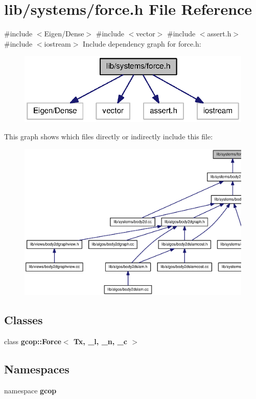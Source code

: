 \section{lib/systems/force.h \-File \-Reference}
\label{force_8h}
{\ttfamily \#include $<$\-Eigen/\-Dense$>$}\*
{\ttfamily \#include $<$vector$>$}\*
{\ttfamily \#include $<$assert.\-h$>$}\*
{\ttfamily \#include $<$iostream$>$}\*
\-Include dependency graph for force.\-h\-:\nopagebreak
\begin{figure}[H]
\begin{center}
\leavevmode
\includegraphics[width=320pt]{force_8h__incl}
\end{center}
\end{figure}
\-This graph shows which files directly or indirectly include this file\-:\nopagebreak
\begin{figure}[H]
\begin{center}
\leavevmode
\includegraphics[width=350pt]{force_8h__dep__incl}
\end{center}
\end{figure}
\subsection*{\-Classes}
\begin{DoxyCompactItemize}
\item 
class {\bf gcop\-::\-Force$<$ Tx, \-\_\-l, \-\_\-n, \-\_\-c $>$}
\end{DoxyCompactItemize}
\subsection*{\-Namespaces}
\begin{DoxyCompactItemize}
\item 
namespace {\bf gcop}
\end{DoxyCompactItemize}
